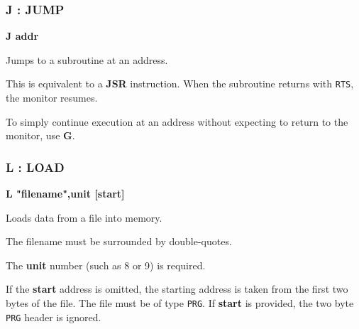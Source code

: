 \subsubsection{J : JUMP}
\begin{description}[leftmargin=2cm,style=nextline]
\item [Format:] {\bf J addr}
\item [Usage:] Jumps to a subroutine at an address.

\item [Remarks:] This is equivalent to a {\bf JSR} instruction. When the subroutine returns with {\tt RTS}, the monitor resumes.

    To simply continue execution at an address without expecting to return to the monitor, use {\bf G}.

\end{description}


\subsubsection{L : LOAD}
\begin{description}[leftmargin=2cm,style=nextline]
\item [Format:] {\bf L "filename",unit [start]}
\item [Usage:] Loads data from a file into memory.

\item [Remarks:] The filename must be surrounded by double-quotes.

    The {\bf unit} number (such as 8 or 9) is required.

    If the {\bf start} address is omitted, the starting address is taken from the first two bytes of the file. The file must be of type {\tt PRG}. If {\bf start} is provided, the two byte {\tt PRG} header is ignored.

\end{description}


